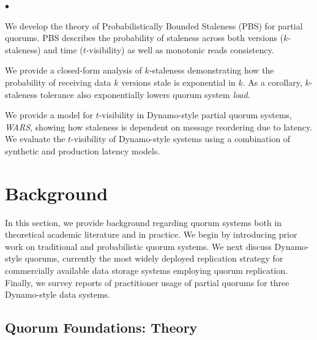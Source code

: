\documentclass{vldb}
\newcommand{\sectionskip}{-0em}
\newcommand{\subsectionskip}{-0em}
\newenvironment{myitemize}
{
   \vspace{-.5em}
    \begin{list}{$\bullet$ }{}
        \setlength{\topsep}{0pt}
        \setlength{\parskip}{0pt}
        \setlength{\partopsep}{0pt}
        \setlength{\parsep}{0pt}         
        \setlength{\itemsep}{.5em} 
}
{
    \end{list} 
    \vspace{-.5em}
}
\begin{document}
\begin{myitemize}

\item We develop the theory of Probabilistically Bounded Staleness
  (PBS) for partial quorums. PBS describes the probability of
  staleness across both versions ($k$-staleness) and time
  ($t$-visibility) as well as monotonic reads consistency.

\item We provide a closed-form analysis of $k$-staleness demonstrating
  how the probability of receiving data $k$ versions stale is
  exponential in $k$.  As a corollary, $k$-staleness tolerance also
  exponentially lowers quorum system \textit{load}.

\item We provide a model for $t$-visibility in Dynamo-style partial
  quorum systems, \textit{WARS}, showing how staleness is dependent on
  message reordering due to latency.  We evaluate the $t$-visibility
  of Dynamo-style systems using a combination of synthetic and
  production latency models.

\end{myitemize}

\vspace{\sectionskip}\section{Background}
\label{sec:background}

In this section, we provide background regarding quorum systems both
in theoretical academic literature and in practice.  We begin by
introducing prior work on traditional and probabilistic quorum
systems.  We next discuss Dynamo-style quorums, currently the most
widely deployed replication strategy for commercially available data
storage systems employing quorum replication.  Finally, we survey
reports of practitioner usage of partial quorums for three
Dynamo-style data systems.

\vspace{\subsectionskip}\subsection{Quorum Foundations: Theory}
\end{document}
